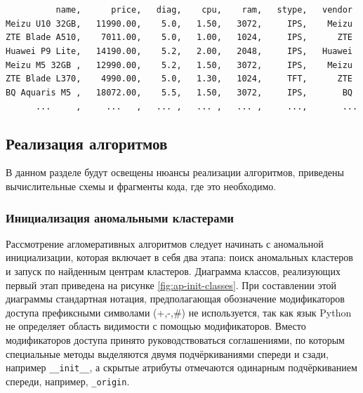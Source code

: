 \documentclass[12pt]{diploma}
\begin{document}
	\begin{tcolorbox}[colframe=black!50!black,coltext=black!25!black,colback=white,title=\textbf{Пример файла входных данных}]
		\verb|          name,      price,   diag,    cpu,    ram,   stype,   vendor |\\
		\verb|Meizu U10 32GB,   11990.00,    5.0,   1.50,   3072,     IPS,    Meizu |\\
		\verb|ZTE Blade A510,    7011.00,    5.0,   1.00,   1024,     IPS,      ZTE |\\
		\verb|Huawei P9 Lite,   14190.00,    5.2,   2.00,   2048,     IPS,   Huawei |\\
		\verb|Meizu M5 32GB ,   12990.00,    5.2,   1.50,   3072,     IPS,    Meizu |\\
		\verb|ZTE Blade L370,    4990.00,    5.0,   1.30,   1024,     TFT,      ZTE |\\
		\verb|BQ Aquaris M5 ,   18072.00,    5.5,   1.50,   3072,     IPS,       BQ |\\
		\verb|      ...     ,     ...   ,   ... ,   ... ,   ... ,     ...,       ... |\\	
	\end{tcolorbox}
	
	\subsection{Реализация алгоритмов}
	В данном разделе будут освещены нюансы реализации алгоритмов, приведены вычислительные схемы и фрагменты кода, где это необходимо.


	\subsubsection{Инициализация аномальными кластерами }
	Рассмотрение агломеративных алгоритмов следует начинать с аномальной инициализации, которая включает в себя два этапа: поиск аномальных кластеров и запуск \kmeans по найденным центрам кластеров. Диаграмма классов, реализующих первый  этап приведена на рисунке \ref{fig:ap-init-classes}. При составлении этой диаграммы стандартная нотация, предполагающая обозначение модификаторов доступа префиксными символами \mbox{(+,-,\#)} не используется, так как язык Python не определяет область видимости с помощью модификаторов. Вместо модификаторов доступа принято руководствоваться соглашениями, по которым специальные методы выделяются двумя подчёркиваниями спереди и сзади, например \texttt{\_\_init\_\_}, а скрытые атрибуты отмечаются одинарным подчёркиванием спереди, например, \texttt{\_origin}.
	
\end{document}
